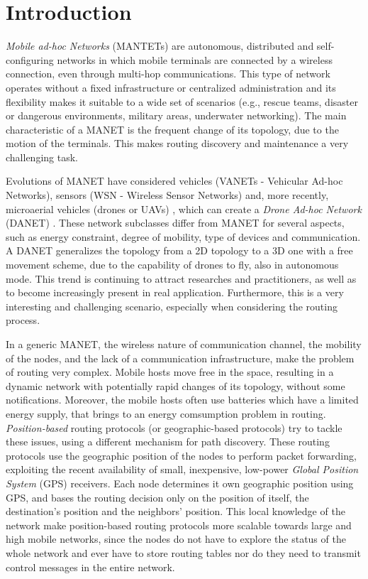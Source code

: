 \documentclass[journal,comsoc]{IEEEtran}
\begin{document}
\section{Introduction}
\emph{Mobile ad-hoc Networks} (MANTETs) are autonomous, distributed and self-configuring networks in which mobile terminals are connected by a wireless connection, even through multi-hop communications. This type of network operates without a fixed infrastructure or centralized administration and its flexibility makes it suitable to a wide set of scenarios (e.g., rescue teams, disaster or dangerous environments, military areas, underwater networking). The main characteristic of a MANET is the frequent change of its topology, due to the motion of the terminals. This makes routing discovery and maintenance a very challenging task. 
\par Evolutions of MANET have considered vehicles (VANETs - Vehicular Ad-hoc Networks), sensors (WSN - Wireless Sensor Networks) and, more recently, microaerial vehicles (drones or UAVs) \cite{puro:deployment, scherer:rescue}, which can create a \emph{Drone Ad-hoc Network} (DANET) \cite{asa:net}. These network subclasses differ from MANET for several aspects, such as energy constraint, degree of mobility, type of devices and communication. A DANET generalizes the topology from a 2D topology to a 3D one with a free movement scheme, due to the capability of drones to fly, also in autonomous mode. This trend is continuing to attract researches and practitioners, as well as to become increasingly present in real application. Furthermore, this is a very interesting and challenging scenario, especially when considering the routing process.
\par In a generic MANET, the wireless nature of communication channel, the mobility of the nodes, and the lack of a communication infrastructure, make the problem of routing very complex. Mobile hosts move free in the space, resulting in a dynamic network with potentially rapid changes of its topology, without some notifications. Moreover, the mobile hosts often use batteries which have a limited energy supply, that brings to an energy comsumption problem in routing. \emph{Position-based} routing protocols (or geographic-based protocols) try to tackle these issues, using a different mechanism for path discovery. These routing protocols use the geographic position of the nodes to perform packet forwarding, exploiting the recent availability of small, inexpensive, low-power \emph{Global Position System} (GPS) receivers. Each node determines it own geographic position using GPS, and bases the routing decision only on the position of itself, the destination's position and the neighbors' position. This local knowledge of the network make position-based routing protocols more scalable towards large and high mobile networks, since the nodes do not have to explore the status of the whole network and ever have to store routing tables nor do they need to transmit control messages in the entire network.
\end{document}
